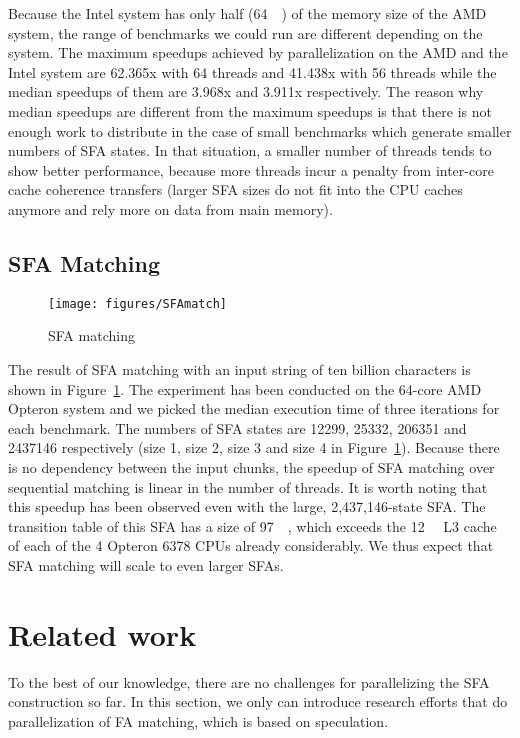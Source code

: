 \documentclass[10pt, conference, compsocconf]{IEEEtran}
\begin{document}
Because the Intel system has only half (\SI{64}{\giga\byte})
of the memory size of the AMD
system, the range of benchmarks we could run are different depending on the
system.  The maximum speedups achieved by parallelization on the AMD and the
Intel
system are 62.365x with 64 threads and 41.438x with 56 threads while the
median speedups of them are 3.968x and 3.911x respectively. The reason why
median speedups are different from the maximum speedups is that there is not
enough work to distribute in the case of small benchmarks which generate
smaller numbers of SFA states. In that situation, a smaller number of threads
tends to show better performance, because more threads incur a penalty from
inter-core cache coherence transfers (larger SFA sizes do not fit into
the CPU caches anymore and rely more on data from main memory).


\subsection{SFA Matching}
\label{sec:sfaMatching}
\begin{figure}[htp]
    \centering
    \vspace{-1mm}
    \texttt{[image: figures/SFAmatch]}
    \caption{SFA matching}
    \label{fig:SFAMatch}
    \vskip-0mm
\end{figure}

The result of SFA matching with an input string of ten billion characters is
shown in  Figure~\ref{fig:SFAMatch}. The experiment has been conducted on the
64-core AMD Opteron system and we picked the median execution time of three
iterations for each benchmark.  The numbers of SFA states are 12299, 25332,
206351 and 2437146 respectively (size 1, size 2, size 3 and size 4 in
Figure~\ref{fig:SFAMatch}).  Because there is no dependency between the input
chunks, the speedup of SFA matching over sequential matching is linear in the
number of threads.
It is worth noting that this speedup has been observed even
with the large, 2,437,146-state SFA. The transition table of
this SFA has a size of \SI{97}{\mega\byte}, which exceeds
the \SI{12}{\mega\byte} L3 cache of each of the 4 Opteron 6378
CPUs already considerably. We thus expect that SFA matching will
scale to even larger SFAs.


\section{Related work}
\label{sec:relatedWork}
To the best of our knowledge, there are no challenges for parallelizing
the SFA construction so far. In this section, we only can 
introduce research efforts that do parallelization of FA matching,
which is based on speculation. 
\end{document}

